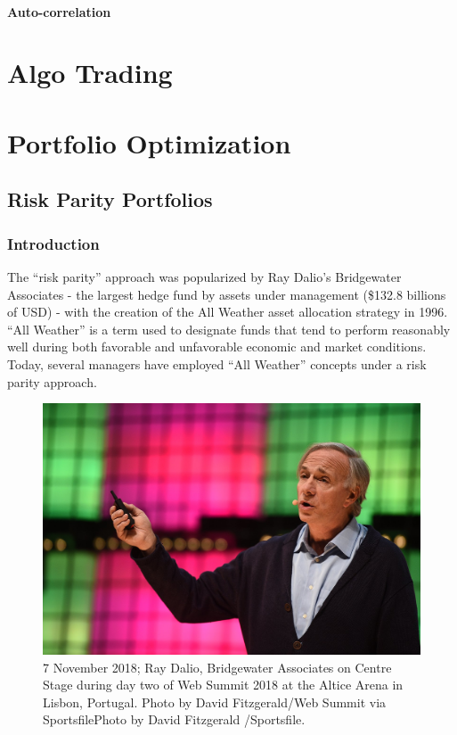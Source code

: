 \documentclass[]{book}
\theoremstyle{definition}
\theoremstyle{definition}
\theoremstyle{definition}
\theoremstyle{remark}
\begin{document}
\subsection{Auto-correlation}\label{auto-correlation}

\part{Algo Trading}\label{part-algo-trading}

\part{Portfolio
Optimization}\label{part-portfolio-optimization}

\chapter{Risk Parity Portfolios}\label{risk-parity-portfolios}

\section{Introduction}\label{introduction-1}

The ``risk parity'' approach was popularized by Ray Dalio's Bridgewater
Associates - the largest hedge fund by assets under management (\$132.8
billions of USD) - with the creation of the All Weather asset allocation
strategy in 1996. ``All Weather'' is a term used to designate funds that
tend to perform reasonably well during both favorable and unfavorable
economic and market conditions. Today, several managers have employed
``All Weather'' concepts under a risk parity approach.

\begin{figure}[H]

{\centering \includegraphics[width=1\linewidth]{./chapters/RiskParity/ray} 

}

\caption{7 November 2018; Ray Dalio, Bridgewater Associates on Centre Stage during day two of Web Summit 2018 at the Altice Arena in Lisbon, Portugal. Photo by David Fitzgerald/Web Summit via SportsfilePhoto by David Fitzgerald /Sportsfile.}\label{fig:unnamed-chunk-39}
\end{figure}
\end{document}
